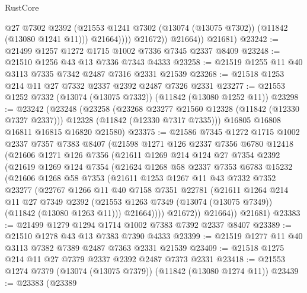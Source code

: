 \begin{lexlean}{RustCore}
\begin{coremodule}
                      @27
                      @7302
                      @2392
                      (@21553 @1241 @7302 (@13074 (@13075 @7302)) (@11842 (@13080 @1241 @11)))
                      @21664))))
              @21672))
          @21664))
      @21681)
@23242 := @21499 @1257 @1272 @1715 @1002 @7336 @7345 @2337 @8409
@23248 := @21510 @1256 @43 @13 @7336 @7343 @4333
@23258 := @21519 @1255 @11 @40 @3113 @7335 @7342 @2487 @7316 @2331 @21539
@23268 := @21518 @1253 @214 @11 @27 @7332 @2337 @2392 @2487 @7326 @2331
@23277 := @21553 @1252 @7332 (@13074 (@13075 @7332)) (@11842 (@13080 @1252 @11))
@23298 := @23242
    (@23248
      (@23258
        (@23268 @23277 @21560 @12328 (@11842 (@12330 @7327 @2337)))
        @12328
        (@11842 (@12330 @7317 @7335)))
      @16805
      @16808
      @16811
      @16815
      @16820
      @21580)
@23375 := @21586
    @7345
    @1272
    @1715
    @1002
    @2337
    @7357
    @7383
    @8407
    (@21598
      @1271
      @126
      @2337
      @7356
      @6780
      @12418
      (@21606
        @1271
        @126
        @7356
        (@21611
          @1269
          @214
          @124
          @27
          @7354
          @2392
          (@21619
            @1269
            @124
            @7354
            (@21624
              @1268
              @58
              @2337
              @7353
              @6783
              @15232
              (@21606
                @1268
                @58
                @7353
                (@21611
                  @1253
                  @1267
                  @11
                  @43
                  @7332
                  @7352
                  @23277
                  (@22767
                    @1266
                    @11
                    @40
                    @7158
                    @7351
                    @22781
                    (@21611
                      @1264
                      @214
                      @11
                      @27
                      @7349
                      @2392
                      (@21553 @1263 @7349 (@13074 (@13075 @7349)) (@11842 (@13080 @1263 @11)))
                      @21664))))
              @21672))
          @21664))
      @21681)
@23383 := @21499 @1279 @1294 @1714 @1002 @7383 @7392 @2337 @8407
@23389 := @21510 @1278 @43 @13 @7383 @7390 @4333
@23399 := @21519 @1277 @11 @40 @3113 @7382 @7389 @2487 @7363 @2331 @21539
@23409 := @21518 @1275 @214 @11 @27 @7379 @2337 @2392 @2487 @7373 @2331
@23418 := @21553 @1274 @7379 (@13074 (@13075 @7379)) (@11842 (@13080 @1274 @11))
@23439 := @23383
    (@23389

\end{coremodule}
\end{lexlean}
